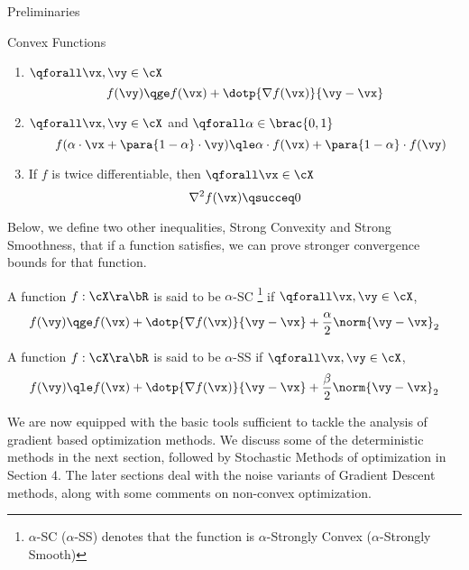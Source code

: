 \documentclass{article}
\begin{document}
\begin{psection}{Preliminaries}
\begin{psubsection}{Convex Functions}
			\begin{enumerate}
				\item $\qforall \vx, \vy \in \cX$
					\begin{equation*}
						f(\vy)	\qge	f(\vx) + \dotp{\nabla f(\vx)}{\vy - \vx}
					\end{equation*}
				\item $\qforall \vx, \vy \in \cX$ and $\qforall \alpha \in \brac{0, 1}$
					\begin{equation}
						\quad f(\alpha \cdot \vx + \para{1 - \alpha} \cdot \vy)	\qle	\alpha \cdot f(\vx) + \para{1 - \alpha} \cdot f(\vy)
						\label{eq:cvx-alt}
					\end{equation}
				\item If $f$ is twice differentiable, then $\qforall \vx \in \cX$
					\begin{equation}
						\nabla^2 f(\vx)	\qsucceq 0
						\label{eq:cvx-2d}
					\end{equation}
			\end{enumerate}

			Below, we define two other inequalities, Strong Convexity and Strong Smoothness, that if a function satisfies, we can prove stronger convergence bounds for that function.
			\begin{definition}
				\label{def:sc}
				A function $f: \cX \ra \bR$ is said to be $\alpha$-SC \footnote{$\alpha$-SC ($\alpha$-SS) denotes that the function is $\alpha$-Strongly Convex ($\alpha$-Strongly Smooth)} if $\qforall \vx, \vy \in \cX$,
				\begin{equation}
					f(\vy)	\qge	f(\vx) + \dotp{\nabla f(\vx)}{\vy - \vx} + \frac{\alpha}{2} \norm{\vy - \vx}_2
					\label{eq:sc}
				\end{equation}
			\end{definition}

			\begin{definition}
				\label{def:sc}
				A function $f: \cX \ra \bR$ is said to be $\alpha$-SS if $\qforall \vx, \vy \in \cX$,
				\begin{equation}
					f(\vy)	\qle	f(\vx) + \dotp{\nabla f(\vx)}{\vy - \vx} + \frac{\beta}{2} \norm{\vy - \vx}_2
					\label{eq:sc}
				\end{equation}
			\end{definition}

		\end{psubsection}

		We are now equipped with the basic tools sufficient to tackle the analysis of gradient based optimization methods. We discuss some of the deterministic methods in the next section, followed by Stochastic Methods of optimization in Section 4. The later sections deal with the noise variants of Gradient Descent methods, along with some comments on non-convex optimization.

	\end{psection}
\end{document}
